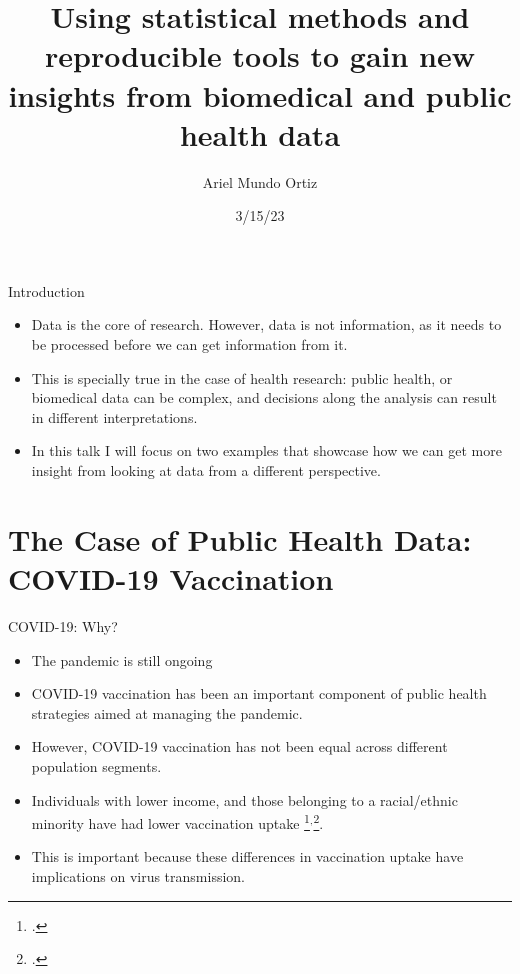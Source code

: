 \documentclass[
  ignorenonframetext,
]{beamer}
\title{Using statistical methods and reproducible tools to gain new
insights from biomedical and public health data}
\author{Ariel Mundo Ortiz}
\date{3/15/23}
\institute{Centre de Recherches Mathematiques, Université de Montréal
\newline \newline \Large \textbf{MfPH Next Generation Seminar Series}}
\begin{document}
\frame{\titlepage}
\ifdefined\Shaded\renewenvironment{Shaded}{\begin{tcolorbox}[interior hidden, enhanced, borderline west={3pt}{0pt}{shadecolor}, frame hidden, sharp corners, boxrule=0pt, breakable]}{\end{tcolorbox}}\fi

\begin{frame}{Introduction}
\protect\hypertarget{introduction}{}
\begin{itemize}[<+->]
\item
  Data is the core of research. However, data is not information, as it
  needs to be processed before we can get information from it.
\item
  This is specially true in the case of health research: public health,
  or biomedical data can be complex, and decisions along the analysis
  can result in different interpretations.
\item
  In this talk I will focus on two examples that showcase how we can get
  more insight from looking at data from a different perspective.
\end{itemize}
\end{frame}

\hypertarget{the-case-of-public-health-data-covid-19-vaccination}{%
\section{The Case of Public Health Data: COVID-19
Vaccination}\label{the-case-of-public-health-data-covid-19-vaccination}}

\begin{frame}{COVID-19: Why?}
\protect\hypertarget{covid-19-why}{}
\begin{itemize}[<+->]
\item
  The pandemic is still ongoing
\item
  COVID-19 vaccination has been an important component of public health
  strategies aimed at managing the pandemic.
\item
  However, COVID-19 vaccination has not been equal across different
  population segments.
\end{itemize}

\pause

\begin{itemize}[<+->]
\item
  Individuals with lower income, and those belonging to a racial/ethnic
  minority have had lower vaccination uptake
  \footcite{nafilyan2021}\(^{,}\)\footcite{gerretsen2021}.
\item
  This is important because these differences in vaccination uptake have
  implications on virus transmission.
\end{itemize}
\end{frame}
\end{document}
